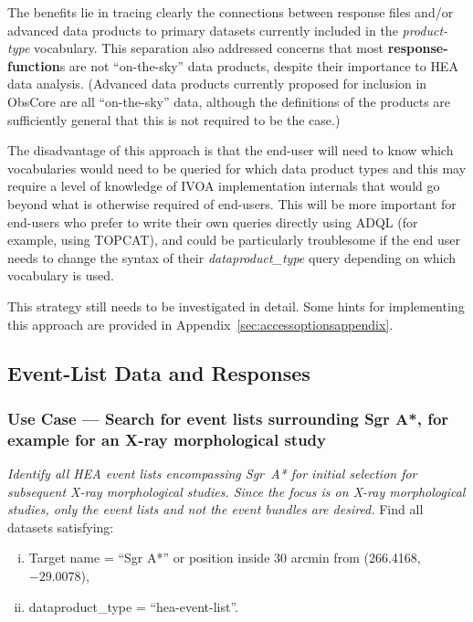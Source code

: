 \begin{itemize}
The benefits lie in tracing clearly the connections between response files and/or advanced data products to primary datasets currently included in the \textsl{product-type} vocabulary.  This separation also addressed concerns that most {\bf response-function}s are not ``on-the-sky'' data products, despite their importance to \gls{HEA} data analysis.  (Advanced data products currently proposed for inclusion in ObsCore are all ``on-the-sky'' data, although the definitions of the products are sufficiently general that this is not required to be the case.)

The disadvantage of this approach is that the end-user will need to know which vocabularies would need to be queried for which data product types and this may require a level of knowledge of IVOA implementation internals that would go beyond what is otherwise required of end-users.  This will be more important for end-users who prefer to write their own queries directly using ADQL (for example, using TOPCAT), and could be particularly troublesome if the end user needs to change the syntax of their {\em dataproduct\_type\/} query depending on which vocabulary is used.

This strategy still needs to be investigated in detail.  Some hints for implementing this approach are provided in Appendix~\ref{sec:accessoptionsappendix}.
\end{itemize}

\pagebreak

\subsection{Event-List Data and Responses}

\subsubsection{Use Case --- Search for event lists surrounding Sgr A*, for example for an X-ray morphological study}

{\em Identify all \gls{HEA} event lists encompassing Sgr~A* for initial selection for subsequent X-ray morphological studies.  Since the focus is on X-ray morphological studies, only the event lists and not the event bundles are desired.\/}
\medskip
\noindent Find all datasets satisfying:
\begin{enumerate}[(i)]
  \item Target name = ``Sgr A*'' or position inside 30 arcmin from (266.4168, $-29.0078$),
  \item dataproduct\_type = ``hea-event-list''.
\end{enumerate}

